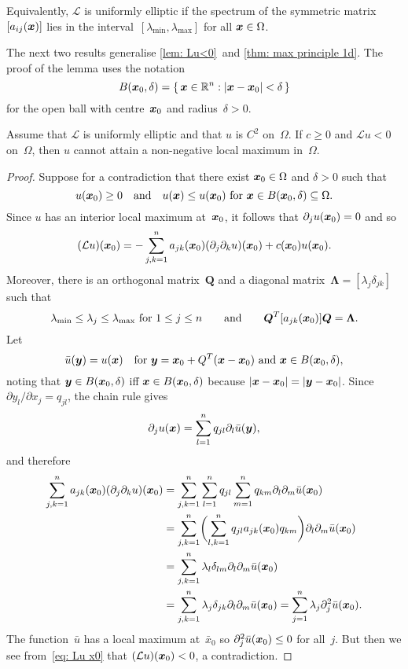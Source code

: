 Equivalently, $\mathcal{L}$ is uniformly elliptic if the spectrum of the 
symmetric matrix~$[a_{ij}(\boldsymbol{x})]$ lies in the 
interval~$[\lambda_{\min},\lambda_{\max}]$ 
for all $\boldsymbol{x}\in\Omega$. 

The next two results generalise \cref{lem: Lu<0}~and 
\cref{thm: max principle 1d}.  The proof of the lemma uses the notation
\[
B(\boldsymbol{x}_0,\delta)=\{\,\boldsymbol{x}\in\mathbb{R}^n:|\boldsymbol{x}-\boldsymbol{x}_0|<\delta\,\}
\]
for the open ball with centre~$\boldsymbol{x}_0$ and radius~$\delta>0$.

\begin{lemma}\label{lem: Lu<0 Omega}
Assume that $\mathcal{L}$ is uniformly elliptic and that $u$ is $C^2$ 
on~$\Omega$.  If $c\ge0$ and $\mathcal{L}u<0$ on~$\Omega$, then $u$ cannot 
attain a non-negative local maximum in~$\Omega$.
\end{lemma}
\begin{proof}
Suppose for a contradiction that there exist $\boldsymbol{x}_0\in\Omega$ and $\delta>0$
such that
\[
u(\boldsymbol{x}_0)\ge0\quad\text{and}\quad 
\text{$u(\boldsymbol{x})\le u(\boldsymbol{x}_0)$ for $\boldsymbol{x}\in B(\boldsymbol{x}_0,\delta)\subseteq\Omega$.}
\]
Since $u$ has an interior local maximum at~$\boldsymbol{x}_0$, it follows that 
$\partial_ju(\boldsymbol{x}_0)=0$ and so
\begin{equation}\label{eq: Lu x0}
(\mathcal{L}u)(\boldsymbol{x}_0)
	=-\sum_{j,k=1}^na_{jk}(\boldsymbol{x}_0)(\partial_j\partial_ku)(\boldsymbol{x}_0)
	+c(\boldsymbol{x}_0)u(\boldsymbol{x}_0).
\end{equation}
Moreover, there is an orthogonal matrix~$\boldsymbol{Q}$ and a diagonal 
matrix~$\boldsymbol{\Lambda}=[\lambda_j\delta_{jk}]$ such that 
\[
\text{$\lambda_{\min}\le\lambda_j\le\lambda_{\max}$ for $1\le j\le n$}
\qquad\text{and}\qquad
\boldsymbol{Q}^T[a_{jk}(\boldsymbol{x}_0)]\boldsymbol{Q}=\boldsymbol{\Lambda}.
\]
Let
\[
\bar u(\boldsymbol{y})=u(\boldsymbol{x})\quad
\text{for $\boldsymbol{y}=\boldsymbol{x}_0+Q^T(\boldsymbol{x}-\boldsymbol{x}_0)$ and $\boldsymbol{x}\in B(\boldsymbol{x}_0,\delta)$,}
\]
noting that $\boldsymbol{y}\in B(\boldsymbol{x}_0,\delta)$ iff $\boldsymbol{x}\in B(\boldsymbol{x}_0,\delta)$ because
$|\boldsymbol{x}-\boldsymbol{x}_0|=|\boldsymbol{y}-\boldsymbol{x}_0|$.  Since $\partial y_l/\partial x_j=q_{jl}$, the 
chain rule gives
\[
\partial_ju(\boldsymbol{x})=\sum_{l=1}^n q_{jl}\partial_l\bar u(\boldsymbol{y}),
\]
and therefore
\begin{align*}
\sum_{j,k=1}^n a_{jk}(\boldsymbol{x}_0)(\partial_j\partial_k u)(\boldsymbol{x}_0)
	&=\sum_{j,k=1}^n\sum_{l=1}^nq_{jl}\sum_{m=1}^nq_{km}
	\partial_l\partial_m\bar u(\boldsymbol{x}_0)\\
	&=\sum_{j,k=1}^n\biggl(\sum_{l,k=1}^n q_{jl}a_{jk}(\boldsymbol{x}_0)q_{km}
	\biggr)\partial_l\partial_m\bar u(\boldsymbol{x}_0)\\
	&=\sum_{j,k=1}^n\lambda_l\delta_{lm}
	\partial_l\partial_m\bar u(\boldsymbol{x}_0)\\
	&=\sum_{j,k=1}^n\lambda_j\delta_{jk}
	\partial_l\partial_m\bar u(\boldsymbol{x}_0)
	=\sum_{j=1}^n\lambda_j\partial_j^2\bar u(\boldsymbol{x}_0).
\end{align*}
The function~$\bar u$ has a local maximum at~$\bar x_0$ so 
$\partial_j^2\bar u(\boldsymbol{x}_0)\le0$ for all~$j$.  But then we see 
from~\eqref{eq: Lu x0} that $(\mathcal{L}u)(\boldsymbol{x}_0)<0$, a contradiction.
\end{proof}

